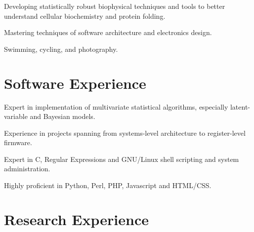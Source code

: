 \documentclass[letterpaper]{article}
\renewenvironment{itemize}{
  \begin{list}{}{
    \setlength{\leftmargin}{1.5em}
  }
}{
  \end{list}
}
\begin{document}
\begin{itemize}
\item{
  Developing statistically robust biophysical techniques and tools to better
  understand cellular biochemistry and protein folding.
}
\item{
  Mastering techniques of software architecture and electronics design.
}
\item{
  Swimming, cycling, and photography.
}
\end{itemize}


\section*{Software Experience}

\begin{itemize}
\item{
  Expert in implementation of multivariate statistical algorithms,
  especially latent-variable and Bayesian models.
}
\item{
  Experience in projects spanning from systems-level architecture to
  register-level firmware.
}
\item{
  Expert in C, Regular Expressions and GNU/Linux shell scripting and
  system administration.
}
\item{
  Highly proficient in Python, Perl, PHP, Javascript and HTML/CSS.
}
\end{itemize}


\section*{Research Experience}
\end{document}
